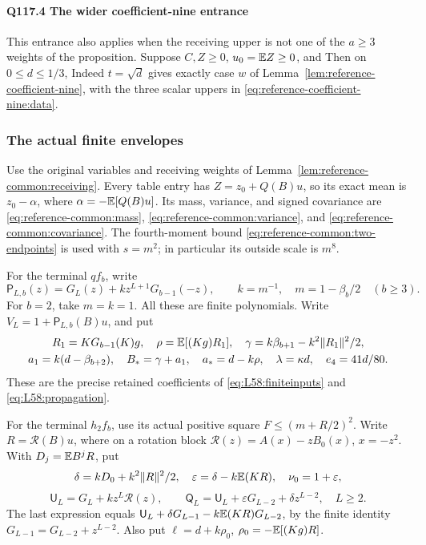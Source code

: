 \paragraph{Q117.4 The wider coefficient-nine entrance}
\label{part:Q117.4}
This entrance also applies when the receiving upper is not one of
the \(a\ge3\) weights of the proposition. Suppose \(C,Z\ge0\),
\(u_0=\mathbb E Z\ge0\), and
Then on \(0\le d\le1/3\),
Indeed \(t=\sqrt d\) gives exactly case \(w\) of
Lemma~\ref{lem:reference-coefficient-nine}, with the three scalar
uppers in \eqref{eq:reference-coefficient-nine:data}.

\subsubsection{The actual finite envelopes}
\label{sec:q117-unified:envelopes}

Use the original variables and receiving weights of
Lemma~\ref{lem:reference-common:receiving}. Every table entry has
\(Z=z_0+Q(B)u\), so its exact mean is \(z_0-\alpha\), where
\(\alpha=-\mathbb E[Q(B)u]\). Its mass, variance, and signed covariance
are \eqref{eq:reference-common:mass},
\eqref{eq:reference-common:variance}, and
\eqref{eq:reference-common:covariance}. The fourth-moment bound
\eqref{eq:reference-common:two-endpoints} is used with \(s=m^2\);
in particular its outside scale is \(m^8\).

For the terminal \(qf_b\), write
\[
 \mathsf P_{L,b}(z)=G_L(z)+kz^{L+1}G_{b-1}(-z),\qquad
 k=m^{-1},\quad m=1-\beta_b/2\quad(b\ge3).
\]
For \(b=2\), take \(m=k=1\). All these are finite polynomials.
Write \(V_L=1+\mathsf P_{L,b}(B)u\), and put
\[
 \begin{gathered}
 R_1=KG_{b-1}(K)g,\quad \rho=\mathbb E[(Kg)R_1],\quad
 \gamma=k\beta_{b+1}-k^2\|R_1\|^2/2,\\
 a_1=k(d-\beta_{b+2}),\quad B_*=\gamma+a_1,\quad
 a_*=d-k\rho,\quad \lambda=\kappa d,\quad e_4=41d/80.
 \end{gathered}
\]
These are the precise retained coefficients of
\eqref{eq:L58:finiteinputs} and \eqref{eq:L58:propagation}.

For the terminal \(h_2f_b\), use its actual positive square
\(F\le(m+R/2)^2\). Write \(R=\mathcal R(B)u\), where
on a rotation block \(\mathcal R(z)=A(x)-zB_0(x)\), \(x=-z^2\).
With \(D_j=\mathbb E B^jR\), put
\[
 \delta=kD_0+k^2\|R\|^2/2,\quad
 \varepsilon=\delta-k\mathbb E(KR),\quad \nu_0=1+\varepsilon,
\]
\[
 \mathsf U_L=G_L+kz^L\mathcal R(z),\qquad
 \mathsf Q_L=\mathsf U_L+\varepsilon G_{L-2}+\delta z^{L-2},
 \quad L\ge2.
\]
The last expression equals
\(\mathsf U_L+\delta G_{L-1}-k\mathbb E(KR)G_{L-2}\), by the finite
identity \(G_{L-1}=G_{L-2}+z^{L-2}\). Also put
\(\ell=d+k\rho_0\), \(\rho_0=-\mathbb E[(Kg)R]\).

